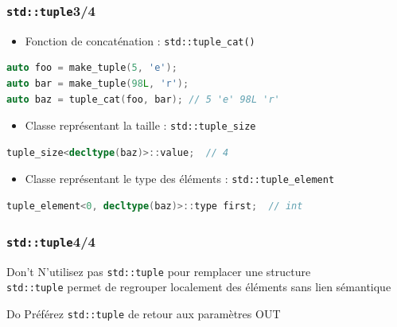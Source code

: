 \documentclass[C++.tex]{subfiles}
\begin{document}
\begin{frame}[fragile]
	\frametitle{\lstinline|std::tuple|\titlehfill{}3/4}
	\begin{itemize}
		\item Fonction de concaténation : \lstinline|std::tuple_cat()|
	\end{itemize}

	\begin{lstlisting}[language=C++]
auto foo = make_tuple(5, 'e');
auto bar = make_tuple(98L, 'r');
auto baz = tuple_cat(foo, bar); // 5 'e' 98L 'r'\end{lstlisting}

	\begin{itemize}
		\item Classe représentant la taille : \lstinline|std::tuple_size|
	\end{itemize}

	\begin{lstlisting}[language=C++]
tuple_size<decltype(baz)>::value;  // 4\end{lstlisting}

	\begin{itemize}
		\item Classe représentant le type des éléments : \lstinline|std::tuple_element|
	\end{itemize}

	\begin{lstlisting}[language=C++]
tuple_element<0, decltype(baz)>::type first;  // int\end{lstlisting}
\end{frame}

\begin{frame}[fragile]
	\frametitle{\lstinline|std::tuple|\titlehfill{}4/4}
	\begin{alertblock}{Don't}
		N'utilisez pas \lstinline|std::tuple| pour remplacer une structure\\
		\lstinline|std::tuple| permet de regrouper localement des éléments sans lien sémantique
	\end{alertblock}

	\begin{exampleblock}{Do}
		Préférez \lstinline|std::tuple| de retour aux paramètres OUT
	\end{exampleblock}
\end{frame}
\end{document}
